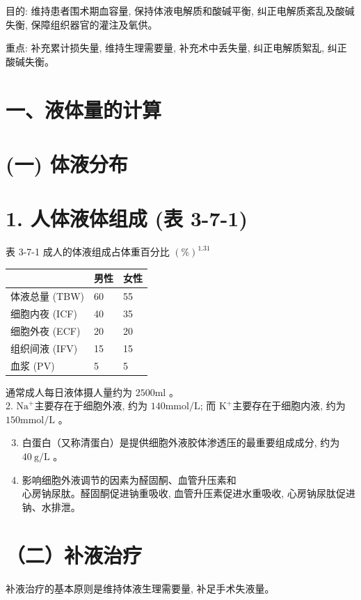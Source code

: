 \documentclass[10pt]{article}
\begin{document}
目的: 维持患者围术期血容量, 保持体液电解质和酸碱平衡, 纠正电解质紊乱及酸碱失衡, 保障组织器官的灌注及氧供。

重点: 补充累计损失量, 维持生理需要量, 补充术中丢失量, 纠正电解质絮乱, 纠正酸碱失衡。

\section*{一、液体量的计算}
\section*{(一) 体液分布}
\section*{1. 人体液体组成 (表 3-7-1)}
表 3-7-1 成人的体液组成占体重百分比 $(\%)^{1.31}$

\begin{center}
\begin{tabular}{lll}
\hline
 & 男性 & 女性 \\
\hline
体液总量 (TBW) & 60 & 55 \\
细胞内夜 (ICF) & 40 & 35 \\
细胞外夜 (ECF) & 20 & 20 \\
组织间液 (IFV) & 15 & 15 \\
血浆 (PV) & 5 & 5 \\
\hline
\end{tabular}
\end{center}

通常成人每日液体摄人量约为 $2500 \mathrm{ml}$ 。\\
2. $\mathrm{Na}^{+}$主要存在于细胞外液, 约为 $140 \mathrm{mmol} / \mathrm{L}$; 而 $\mathrm{K}^{+}$主要存在于细胞内液, 约为 $150 \mathrm{mmol} / \mathrm{L}$ 。

\begin{enumerate}
  \setcounter{enumi}{2}
  \item 白蛋白（又称清蛋白）是提供细胞外液胶体渗透压的最重要组成成分, 约为 $40 \mathrm{~g} / \mathrm{L}$ 。

  \item 影响细胞外液调节的因素为醛固酮、血管升压素和\\
心房钠尿肽。醛固酮促进钠重吸收, 血管升压素促进水重吸收, 心房钠尿肽促进钠、水排泄。

\end{enumerate}

\section*{（二）补液治疗}
补液治疗的基本原则是维持体液生理需要量, 补足手术失液量。
\end{document}
